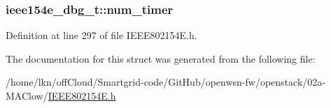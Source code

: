 \subsubsection[{\texorpdfstring{num\+\_\+timer}{num_timer}}]{ ieee154e\+\_\+dbg\+\_\+t\+::num\+\_\+timer}\hypertarget{structieee154e__dbg__t_aafebfb91f54e47303e95f65129709512}{}\label{structieee154e__dbg__t_aafebfb91f54e47303e95f65129709512}


Definition at line 297 of file I\+E\+E\+E802154\+E.\+h.



The documentation for this struct was generated from the following file\+:\begin{DoxyCompactItemize}
\item 
/home/lkn/off\+Cloud/\+Smartgrid-\/code/\+Git\+Hub/openwsn-\/fw/openstack/02a-\/\+M\+A\+Clow/\hyperlink{_i_e_e_e802154_e_8h}{I\+E\+E\+E802154\+E.\+h}\end{DoxyCompactItemize}
